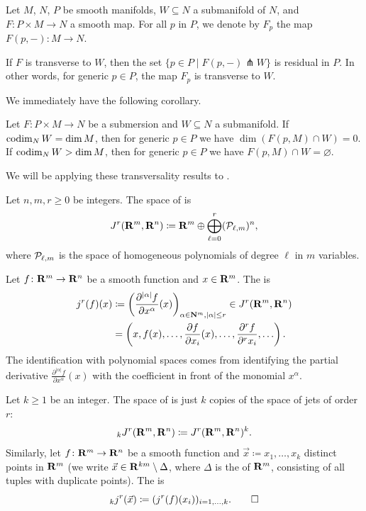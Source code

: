 \begin{theorem}
\label{E!T:parametric-transversality}
  Let $M$, $N$, $P$ be smooth manifolds, $W \subseteq N$ a submanifold of $N$, and $F \colon P \times M \to N$ a smooth map. For all $p$ in $P$, we denote by $F_p$ the map $F(p, -) \colon M \to N$.

  If $F$ is transverse to $W$, then the set $\{p \in P \mid F(p, -) \pitchfork W\}$ is residual in $P$. In other words, for generic $p \in P$, the map $F_p$ is transverse to $W$.
\end{theorem}

We immediately have the following corollary.

\begin{corollary}
\label{E!C:param-trans-cor}
  Let $F \colon P \times M \to N$ be a submersion and $W \subseteq N$ a submanifold. If $\operatorname{codim}_N W = \dim M$, then for generic $p \in P$ we have $\dim(F(p, M) \cap W) = 0$. If $\operatorname{codim}_N W > \dim M$, then for generic $p \in P$ we have $F(p, M) \cap W = \varnothing$.
\end{corollary}

We will be applying these transversality results to .

\begin{definition}
  Let $n, m, r \geq 0$ be integers. The space of  is
  \[
    J^r(\mathbf{R}^m, \mathbf{R}^n) \coloneq \mathbf{R}^m \oplus \bigoplus_{\ell = 0}^r (\mathcal{P}_{\ell, m})^n,
  \]
  where $\mathcal{P}_{\ell, m}$ is the space of homogeneous polynomials of degree $\ell$ in $m$ variables.
  
  Let $f \colon \mathbf{R}^m \to \mathbf{R}^n$ be a smooth function and $x \in \mathbf{R}^m$. The  is
  \begin{align*}
    j^r(f)(x) & \coloneq \left( \frac{\partial^{|\alpha|} f}{\partial x^\alpha}(x) \right)_{\alpha \in \mathbf{N}^m, |\alpha| \leq r} \in J^r(\mathbf{R}^m, \mathbf{R}^n) \\
    & = \left(x, f(x), \ldots, \frac{\partial f}{\partial x_i}(x), \ldots, \frac{\partial^r f}{\partial^r x_i}, \ldots \right).
  \end{align*}
  The identification with polynomial spaces comes from identifying the partial derivative $\frac{\partial^{|\alpha|} f}{\partial x^\alpha}(x)$ with the coefficient in front of the monomial $x^\alpha$.
  
  Let $k \geq 1$ be an integer. The space of  is just $k$ copies of the space of jets of order $r$:
  \[
    {}_k J^r(\mathbf{R}^m, \mathbf{R}^n) \coloneq J^r(\mathbf{R}^m, \mathbf{R}^n)^k.
  \]
  Similarly, let $f \colon \mathbf{R}^m \to \mathbf{R}^n$ be a smooth function and $\vec{x} \coloneq x_1, \ldots, x_k$ distinct points in $\mathbf{R}^m$ (we write $\vec{x} \in \mathbf{R}^{km} \setminus \Delta$, where $\Delta$ is the  of $\mathbf{R}^m$, consisting of all tuples with duplicate points). The  is
  \[
    {}_k j^r(\vec{x}) \coloneq (j^r(f)(x_i))_{i = 1, \ldots, k}.
    \qedhere
  \]
\end{definition}

